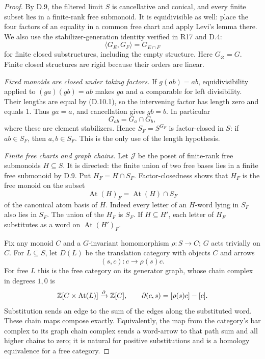 \begin{proof}
By D.9, the filtered limit $S$ is cancellative and conical, and
every finite subset lies in a finite-rank free submonoid.
It is equidivisible as well: place the four factors of an equality
in a common free chart and apply Levi's lemma there.
We also use the stabilizer-generation identity verified
in R17 and D.4:
\[
                \langle G_E,G_F\rangle=G_{E\cap F}
 \tag{D.10.3}
\]
for finite closed substructures, including the empty structure.
Here $G_\varnothing=G$. Finite closed structures are rigid because
their orders are linear.

\emph{Fixed monoids are closed under taking factors.}
If $g(ab)=ab$, equidivisibility applied to $(ga)(gb)=ab$ makes
$ga$ and $a$ comparable for left divisibility. Their lengths
are equal by (D.10.1), so the intervening factor has length zero
and equals $1$. Thus $ga=a$, and cancellation gives $gb=b$.
In particular
\[
                    G_{ab}=G_a\cap G_b,
\]
where these are element stabilizers. Hence
$S_F=S^{G_F}$ is factor-closed in $S$: if $ab\in S_F$, then
$a,b\in S_F$. This is the only use of the length hypothesis.

\emph{Finite free charts and graph chains.}
Let $\mathcal J$ be the poset of finite-rank free submonoids
$H\subseteq S$. It is directed: the finite union of two free
bases lies in a finite free submonoid by D.9. Put
$H_F=H\cap S_F$. Factor-closedness shows that $H_F$ is the free
monoid on the subset
\[
             \operatorname{At}(H)_F
                  =\operatorname{At}(H)\cap S_F
\]
of the canonical atom basis of $H$. Indeed every letter of an
$H$-word lying in $S_F$ also lies in $S_F$. The union of the
$H_F$ is $S_F$. If $H\subseteq H'$, each letter of $H_F$
substitutes as a word on $\operatorname{At}(H')_F$.

Fix any monoid $C$ and a $G$-invariant homomorphism $\rho:S\to C$;
$G$ acts trivially on $C$. For $L\subseteq S$, let $D(L)$ be
the translation category with objects $C$ and arrows
\[
                    (s,c):c\longrightarrow\rho(s)c.
\]
For free $L$ this is the free category on its generator graph,
whose chain complex in degrees $1,0$ is
\[
 \mathbb Z[C\times\operatorname{At}(L)]\xrightarrow{\partial}\mathbb Z[C],
 \qquad \partial(c,s)=[\rho(s)c]-[c].
\]
Substitution sends an edge to the sum of the edges along the
substituted word. These chain maps compose exactly. Equivalently,
the map from the category's bar complex to its graph chain complex
sends a word-arrow to that path sum and all higher chains to zero;
it is natural for positive substitutions and is a homology
equivalence for a free category.


\end{proof}
